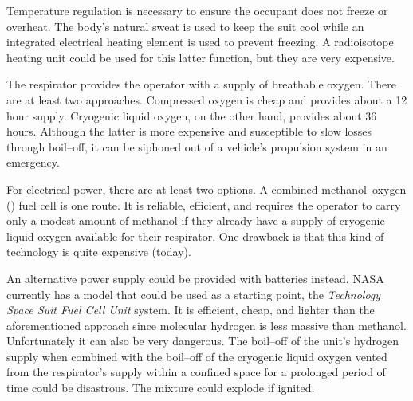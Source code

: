 Temperature regulation is necessary to ensure the occupant does not freeze or overheat. The body's natural sweat is used to keep the suit cool while an integrated electrical heating element is used to prevent freezing. A radioisotope heating unit could be used for this latter function, but they are very expensive.

The respirator provides the operator with a supply of breathable oxygen. There are at least two approaches. Compressed oxygen is cheap and provides about a 12 hour supply. Cryogenic liquid oxygen, on the other hand, provides about 36 hours. Although the latter is more expensive and susceptible to slow losses through boil--off, it can be siphoned out of a vehicle's propulsion system in an emergency.

For electrical power, there are at least two options. A combined methanol--oxygen () fuel cell is one route. It is reliable, efficient, and requires the operator to carry only a modest amount of methanol if they already have a supply of cryogenic liquid oxygen available for their respirator. One drawback is that this kind of technology is quite expensive (today).

An alternative power supply could be provided with batteries instead. NASA currently has a model that could be used as a starting point, the {\it {} Technology Space Suit Fuel Cell Unit} system. It is efficient, cheap, and lighter than the aforementioned approach since molecular hydrogen is less massive than methanol. Unfortunately it can also be very dangerous. The boil--off of the unit's hydrogen supply when combined with the boil--off of the cryogenic liquid oxygen vented from the respirator's supply within a confined space for a prolonged period of time could be disastrous. The mixture could explode if ignited.

